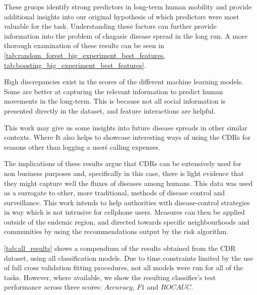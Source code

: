 These gruops identify strong predictors in long-term human mobility and provide additional insights into our original hypothesis of which predictors were most valuable for the task.
Understanding these factors can further provide information into the problem of chagasic disease spread in the long run.
A more thorough examination of these results can be seen in \cref{tab:random_forest_big_experiment_best_features, tab:boosting_big_experiment_best_features}.


High discrepancies exist in the scores of the different machine learning models.
Some are better at capturing the relevant information to predict human movements in the long-term.
This is because not all social information is presented directly in the dataset, and feature interactions are helpful.


This work may give us some insights into future disease spreads in other similar contexts.
Where
It also helps to showcase interesting ways of using the CDRs for reasons other than logging a user\'s calling expenses.



The implications of these results argue that CDRs can be extensively used for non business purposes and, specifically in this case, there is light evidence that they might capture well the fluxes of diseases among humans.
This data was used as a surrogate to other, more traditional, methods of disease control and surveillance.
This work intends to help authorities with disease-control strategies in way which is not intrusive for cellphone users.
Measures can then be applied outside of the endemic region, and directed towards specific neighbourhoods and communities by using the recommendations output by the risk algorithm.


\cref{tab:all_results} shows a compendium of the results obtained from the CDR dataset, using all classification models.
Due to time constraints limited by the use of full cross validation fitting procedures, not all models were run for all of the tasks.
However, where available, we show the resulting classifier's test performance across three scores: $Accuracy$, $F1$ and $ROC AUC$.

